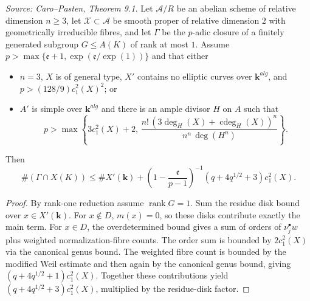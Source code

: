 \begin{theorem}
  \label{thm:cp_main_local}
  \textit{Source: Caro--Pasten, Theorem 9.1.}
  Let \(\mathcal A/R\) be an abelian scheme of relative dimension \(n\ge3\),
  let \(\mathcal X\subset\mathcal A\) be smooth proper of relative dimension
  \(2\) with geometrically irreducible fibres, and let
  \(\Gamma\) be the \(p\)-adic closure of a finitely generated subgroup
  \(G\le A(K)\) of rank at most \(1\).  Assume
  \(p>\max\{\mathfrak e+1,\exp(\mathfrak e/\exp(1))\}\) and that either
  \begin{itemize}
    \item[(i)] \(n=3\), \(X\) is of general type, \(X'\) contains no elliptic
      curves over \(\mathbf k^{alg}\), and \(p>(128/9)c_1^2(X)^2\); or
    \item[(ii)] \(A'\) is simple over \(\mathbf k^{alg}\) and there is an ample
      divisor \(H\) on \(A\) such that
      \[
        p>\max\left\{3c_1^2(X)+2,\,
          \frac{n!\,(3\deg_H(X)+\operatorname{cdeg}_H(X))^n}
               {n^n\,\deg(H^n)}\right\}.
      \]
  \end{itemize}
  Then
  \[
    \#(\Gamma\cap X(K))\le
    \#X'(\mathbf k)+
    \left(1-\frac{\mathfrak e}{p-1}\right)^{-1}
    (q+4q^{1/2}+3)c_1^2(X).
  \]
\end{theorem}
\begin{proof}
  By rank-one reduction assume \(\operatorname{rank}G=1\).  Sum the residue
  disk bound over \(x\in X'(\mathbf k)\).  For \(x\notin D\), \(m(x)=0\), so
  these disks contribute exactly the main term.  For \(x\in D\), the
  overdetermined bound gives a sum of orders of \(\nu_j^\bullet w\) plus
  weighted normalization-fibre counts.  The order sum is bounded by
  \(2c_1^2(X)\) via the canonical genus bound.  The weighted fibre count is
  bounded by the modified Weil estimate and then again by the canonical genus
  bound, giving \((q+4q^{1/2}+1)c_1^2(X)\).  Together these contributions
  yield \((q+4q^{1/2}+3)c_1^2(X)\), multiplied by the residue-disk factor.
\end{proof}


